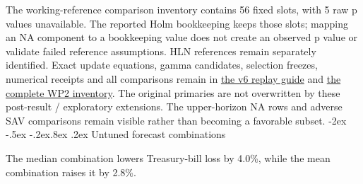 \documentclass[10pt,a4paper]{article}
\makeatletter
\renewcommand\section{\@startsection{section}{1}{\z@}%
  {-2ex \@plus -.5ex \@minus -.2ex}{.8ex \@plus .2ex}%
  {\normalfont\large\bfseries}}
\makeatother
\begin{document}
The working-reference comparison inventory contains 56 fixed slots,
with 5 raw p values unavailable.
The reported Holm bookkeeping keeps those slots; mapping an NA component to a
bookkeeping value does not create an observed p value or validate failed
reference assumptions. HLN references remain separately identified.
Exact update equations, gamma candidates, selection freezes,
numerical receipts and all comparisons remain in
\href{https://github.com/ByronLi0207/financial-mathematics-paper-20261020/blob/revision-v7-final/protocol/revision-v6/REPLAY.md}{the v6 replay guide} and
\href{https://github.com/ByronLi0207/financial-mathematics-paper-20261020/blob/revision-v7-final/results/revision-20261023/v6/wp2-summary.json}{the complete WP2 inventory}.
The original primaries are not overwritten by these post-result / exploratory
extensions. The upper-horizon NA rows and adverse SAV comparisons remain
visible rather than becoming a favorable subset.\section{Untuned forecast combinations}\label{sup:wp3}

The median combination lowers Treasury-bill loss by 4.0\%, while the mean combination raises it by 2.8\%.
\end{document}
